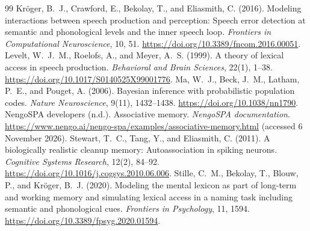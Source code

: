 \begin{thebibliography}{99}
Kröger, B.~J., Crawford, E., Bekolay, T., and Eliasmith, C. (2016).
Modeling interactions between speech production and perception: Speech error detection at semantic and phonological levels and the inner speech loop.
\textit{Frontiers in Computational Neuroscience}, 10, 51.
\url{https://doi.org/10.3389/fncom.2016.00051}.
Levelt, W.~J.~M., Roelofs, A., and Meyer, A.~S. (1999).
A theory of lexical access in speech production.
\textit{Behavioral and Brain Sciences}, 22(1), 1--38.
\url{https://doi.org/10.1017/S0140525X99001776}.
Ma, W.~J., Beck, J.~M., Latham, P.~E., and Pouget, A. (2006).
Bayesian inference with probabilistic population codes.
\textit{Nature Neuroscience}, 9(11), 1432--1438.
\url{https://doi.org/10.1038/nn1790}.
NengoSPA developers (n.d.).
Associative memory.
\textit{NengoSPA documentation}.
\url{https://www.nengo.ai/nengo-spa/examples/associative-memory.html} (accessed 6 November 2026).
Stewart, T.~C., Tang, Y., and Eliasmith, C. (2011).
A biologically realistic cleanup memory: Autoassociation in spiking neurons.
\textit{Cognitive Systems Research}, 12(2), 84--92.
\url{https://doi.org/10.1016/j.cogsys.2010.06.006}.
Stille, C.~M., Bekolay, T., Blouw, P., and Kröger, B.~J. (2020).
Modeling the mental lexicon as part of long-term and working memory and simulating lexical access in a naming task including semantic and phonological cues.
\textit{Frontiers in Psychology}, 11, 1594.
\url{https://doi.org/10.3389/fpsyg.2020.01594}.
\end{thebibliography}
